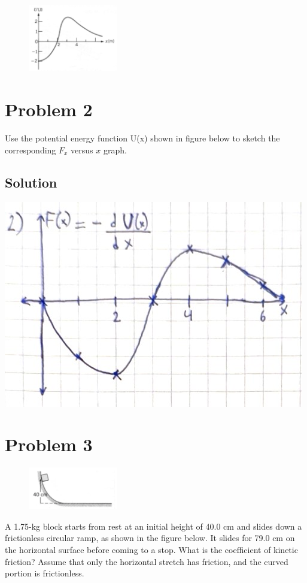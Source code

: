 \documentclass[12pt]{article}
\begin{document}
\pagebreak
\begin{figure}
    \vspace{-40pt}
    \includegraphics[width=0.35\textwidth]{graph_2.png} 
\end{figure}
\section*{Problem 2}
Use the potential energy function U(x) shown in figure below to sketch the corresponding $F_x$ versus $x$ graph.

\subsection*{Solution}
\includegraphics[scale=0.5]{graph_2s.JPG}

\pagebreak
\section*{Problem 3}
\begin{figure}
    \vspace{-30pt}
    \includegraphics[width=0.35\textwidth]{graph_3.png} 
\end{figure}
A 1.75-kg block starts from rest at an initial height of 40.0 cm and slides down a frictionless circular ramp, as shown in the figure below. It slides for 79.0 cm on the horizontal surface before coming to a stop. What is the coefficient of kinetic friction? Assume that only the horizontal stretch has friction, and the curved portion is frictionless.
\end{document}
